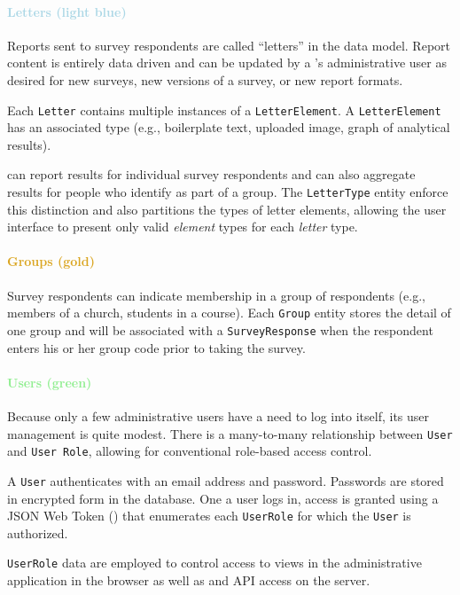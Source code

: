 \documentclass{article}
\begin{document}
\paragraph{\textcolor{LightBlue}{Letters (light blue)}}

Reports sent to survey respondents are called ``letters'' in the data model.
Report content is entirely data driven and can be updated by a \caper's administrative user
as desired for new surveys, new versions of a survey, or new report formats.

Each \texttt{Letter} contains multiple
instances of a \texttt{LetterElement}.
A \texttt{LetterElement} has an associated type
(e.g., boilerplate text,
uploaded image,
graph of analytical results).

\caper{} can report results for individual survey respondents
and can also aggregate results for people who identify as part of a group.
The \texttt{LetterType} entity enforce this distinction
and also partitions the types of letter elements,
allowing the user interface to present only valid \emph{element} types
for each \emph{letter} type.

\paragraph{\textcolor{Goldenrod}{Groups (gold)}}

Survey respondents can indicate membership in a group of respondents
(e.g., members of a church, students in a course).
Each \texttt{Group} entity stores the detail of one group
and will be associated with a \texttt{SurveyResponse}
when the respondent enters his or her group code
prior to taking the survey.

\paragraph{\textcolor{LightGreen}{Users (green)}}

Because only a few administrative users have a need to log into \caper{} itself,
its user management is quite modest.
There is a many-to-many relationship between \texttt{User} and \texttt{User Role},
allowing for conventional role-based access control.

A \texttt{User} authenticates with an email address and password.
Passwords are stored in encrypted form in the database.
One a user logs in,
access is granted using a
JSON Web Token (\jwt)
that enumerates each \texttt{UserRole} for which the \texttt{User} is authorized.

\texttt{UserRole} data are employed to control access to views
in the administrative application in the browser
as well as \gql{} and \rest{} API access on the server.
\end{document}
